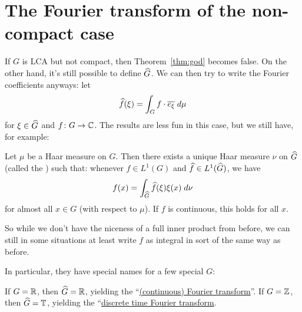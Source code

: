 \section{The Fourier transform of the non-compact case}
If $G$ is LCA but not compact, then Theorem~\ref{thm:god} becomes false.
On the other hand, it's still possible to define $\widehat G$.
We can then try to write the Fourier coefficients anyways:
let \[ \widehat f(\xi) = \int_G f \cdot \overline{e_\xi} \; d\mu \]
for $\xi \in \widehat G$ and $f \colon G \to \mathbb C$.
The results are less fun in this case, but we still have, for example:
\begin{theorem}
	Let $\mu$ be a Haar measure on $G$.
	Then there exists a unique Haar measure $\nu$ on $\widehat G$
	(called the ) such that:
	whenever $f \in L^1(G)$ and $\widehat f \in L^1(\widehat G)$, we have
	\[ f(x) = \int_{\widehat G} \widehat f(\xi) \xi(x) \; d\nu \]
	for almost all $x \in G$ (with respect to $\mu$).
	If $f$ is continuous, this holds for all $x$.
\end{theorem}
So while we don't have the niceness of a full inner product from before,
we can still in some situations at least write $f$ as integral
in sort of the same way as before.

In particular, they have special names for a few special $G$:
\begin{itemize}
	\ii If $G = \mathbb R$, then $\widehat G = \mathbb R$,
	yielding the
	``\href{https://en.wikipedia.org/wiki/Fourier_transform}{(continuous) Fourier transform}''.
	\ii If $G = \mathbb Z$, then $\widehat G = \mathbb T$,
	yielding the
	``\href{https://en.wikipedia.org/wiki/Discrete-time_Fourier_transform}{discrete time Fourier transform}.
\end{itemize}

